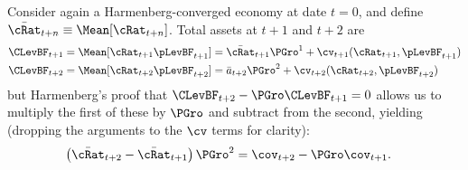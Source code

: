 \documentclass[BufferStockTheory]{subfiles}
\begin{document}
Consider again a Harmenberg-converged economy at date $t=0$, and define $\bar{\cRat}_{t+n} \equiv \Mean[\cRat_{t+n}]$.  
Total assets at $t+1$ and $t+2$ are
\begin{align}
  \CLevBF_{t+1} & = \Mean[\cRat_{t+1}\pLevBF_{t+1}] = \bar{\cRat}_{t+1}\PGro^{1} + \cv_{t+1}(\cRat_{t+1}, \pLevBF_{t+1}) \notag
\\  \CLevBF_{t+2} & = \Mean[\cRat_{t+2}\pLevBF_{t+2}] = \bar{a}_{t+2}\PGro^{2} + \cv_{t+2}(\cRat_{t+2}, \pLevBF_{t+2}) \label{eq:atp2vsatp1}
\end{align}
but Harmenberg's proof that $\CLevBF_{t+2}-\PGro \CLevBF_{t+1}=0$ allows us to multiply the first of these by $\PGro$ and subtract from the second, yielding (dropping the arguments to the $\cv$ terms for clarity):
\begin{align*}
 \left(\bar{\cRat}_{t+2} - \bar{\cRat}_{t+1}\right)\PGro^{2} & = \cov_{t+2}  - \PGro \cov_{t+1}. \label{eq:MeanaRatVsCovGro2}%
\end{align*}
\end{document}
